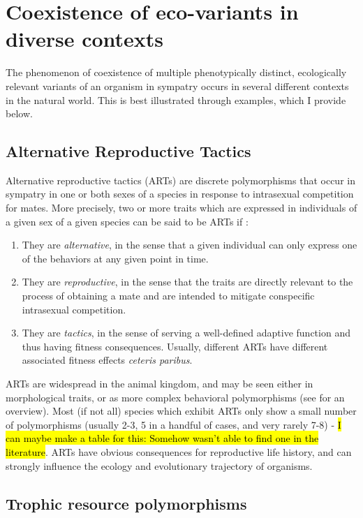 \section{Coexistence of eco-variants in diverse contexts}\label{synthesis}
The phenomenon of coexistence of multiple phenotypically distinct, ecologically relevant variants of an organism in sympatry occurs in several different contexts in the natural world. This is best illustrated through examples, which I provide below.
\subsection{Alternative Reproductive Tactics}
Alternative reproductive tactics (ARTs) are discrete polymorphisms that occur in sympatry in one or both sexes of a species in response to intrasexual competition for mates. More precisely, two or more traits which are expressed in individuals of a given sex of a given species can be said to be ARTs if \citep{oliveira_alternative_2008}:
\begin{enumerate}[label=(\alph*)]
    \item They are \emph{alternative}, in the sense that a given individual can only express one of the behaviors at any given point in time.
    \item They are \emph{reproductive}, in the sense that the traits are directly relevant to the process of obtaining a mate and are intended to mitigate conspecific intrasexual competition.
    \item They are \emph{tactics}, in the sense of serving a well-defined adaptive function and thus having fitness consequences. Usually, different ARTs have different associated fitness effects \emph{ceteris paribus}.
\end{enumerate}
ARTs are widespread in the animal kingdom, and may be seen either in morphological traits, or as more complex behavioral polymorphisms (see \citep{oliveira_alternative_2008} for an overview). Most (if not all) species which exhibit ARTs only show a small number of polymorphisms (usually 2-3, 5 in a handful of cases, and very rarely 7-8) - \hl{I can maybe make a table for this: Somehow wasn't able to find one in the literature}. ARTs have obvious consequences for reproductive life history, and can strongly influence the ecology and evolutionary trajectory of organisms.

\subsection{Trophic resource polymorphisms}

